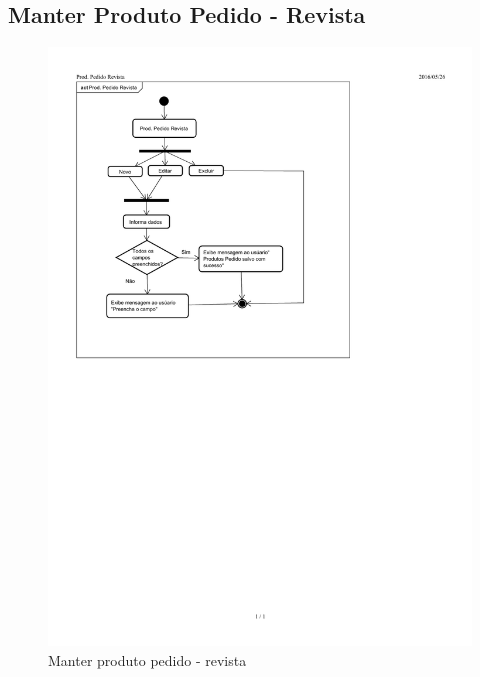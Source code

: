 \documentclass[chapter=TITLE,12pt,oneside,a4paper,english,french,sumario=tradicional,spanish,brazil,]{abntex2}
\begin{document}
\subsection{Manter Produto Pedido - Revista}
\begin{figure}[h]\centering
	\includegraphics[scale=1.61]{produto-pedido-revista.pdf}\caption{Manter produto pedido - revista}
\end{figure}


\newpage
\end{document}
